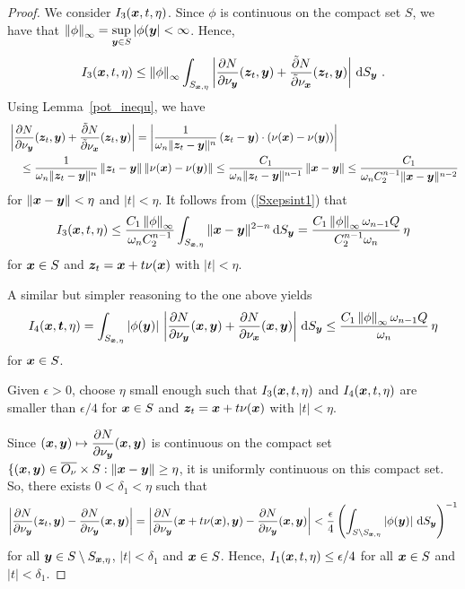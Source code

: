 \begin{proof}
 We consider $I_3({\bm{x}},t,\eta)$.
Since $\phi$ is continuous on the compact set $S$, we have that
$\displaystyle
\left\|\phi\right\|_{\infty} = \sup_{{\bm{y}}\in S}|\phi({\bm{y}}| < \infty$.
Hence,
\[
I_3({\bm{x}},t,\eta)
\leq \left\|\phi\right\|_{\infty} \int_{S_{{\bm{x}},\eta}}
\left| \frac{\partial{N}}{\partial \nu_{{\bm{y}}}}({\bm{z}}_t,{\bm{y}}) +
\frac{\tilde{\partial}{N}}{\tilde{\partial}{\nu_{{\bm{x}}}}}({\bm{z}}_t,{\bm{y}})\right| \,\mathrm{d}{S}_{{\bm{y}}} \  .
\]
Using Lemma~\ref{pot_inequ}, we have
\begin{align*}
&\left| \frac{\partial{N}}{\partial \nu_{{\bm{y}}}}({\bm{z}}_t,{\bm{y}}) +
\frac{\tilde{\partial}{N}}{\tilde{\partial}{\nu_{{\bm{x}}}}}({\bm{z}}_t,{\bm{y}})\right|
= \left| \frac{1}{\omega_n \|{\bm{z}}_t-{\bm{y}}\|^n}\,({\bm{z}}_t-{\bm{y}})\cdot
(\nu({\bm{x}}) - \nu({\bm{y}})) \right| \\
&\quad
\leq \frac{1}{\omega_n \|{\bm{z}}_t-{\bm{y}}\|^n}\,\|{\bm{z}}_t-{\bm{y}}\|\,
\|\nu({\bm{x}}) - \nu({\bm{y}})\|
\leq \frac{C_1}{\omega_n \|{\bm{z}}_t-{\bm{y}}\|^{n-1}}\,\|{\bm{x}}-{\bm{y}}\|
\leq \frac{C_1}{\omega_n C_2^{n-1}\|{\bm{x}}-{\bm{y}}\|^{n-2}}
\end{align*}
for $\|{\bm{x}} - {\bm{y}}\| < \eta$ and $|t| < \eta$.  It follows from
(\ref{Sxepsint1}) that
\[
I_3({\bm{x}},t,\eta)
\leq \frac{C_1 \left\|\phi\right\|_{\infty}}{\omega_n C_2^{n-1}}
\int_{S_{{\bm{x}},\eta}} \|{\bm{x}}-{\bm{y}}\|^{2-n} \,\mathrm{d}{S}_{{\bm{y}}}
= \frac{C_1 \left\|\phi\right\|_{\infty} \omega_{n-1} Q}{C_2^{n-1}\omega_n}
\, \eta
\]
for ${\bm{x}} \in S$ and
${\bm{z}}_t = {\bm{x}}+t\nu({\bm{x}})$ with $|t|< \eta$.

 A similar but simpler reasoning to the one above yields
\[
I_4({\bm{x}},{\bm{t}},\eta)
= \int_{S_{{\bm{x}},\eta}} \left|\phi({\bm{y}})\right|\,
\left| \frac{\partial{N}}{\partial \nu_{{\bm{y}}}}({\bm{x}},{\bm{y}}) +
\frac{\partial{N}}{\partial \nu_{{\bm{x}}}}({\bm{x}},{\bm{y}})\right| \,\mathrm{d}{S}_{{\bm{y}}}
\leq \frac{C_1 \left\|\phi\right\|_{\infty}\omega_{n-1} Q}{\omega_n}\, \eta
\]
for ${\bm{x}} \in S$.

 Given $\epsilon > 0$, choose $\eta$ small enough such that
$I_3({\bm{x}},t,\eta)$ and $I_4({\bm{x}},t,\eta)$ are smaller
than $\epsilon/4$ for ${\bm{x}} \in S$ and
${\bm{z}}_t = {\bm{x}}+t\nu({\bm{x}})$ with $|t|< \eta$.

Since $\displaystyle ({\bm{x}},{\bm{y}}) \mapsto
\frac{\partial{N}}{\partial \nu_{{\bm{y}}}}({\bm{x}},{\bm{y}})$ is
continuous on the compact set
$\{({\bm{x}},{\bm{y}}) \in \overline{O_\nu} \times S :
\|{\bm{x}} - {\bm{y}}\| \geq \eta$,
it is uniformly continuous on this compact set.  So, there exists
$0 < \delta_1 < \eta$ such that
\[
\left| \frac{\partial{N}}{\partial \nu_{{\bm{y}}}}({\bm{z}}_t,{\bm{y}}) -
\frac{\partial{N}}{\partial \nu_{{\bm{y}}}}({\bm{x}},{\bm{y}})\right|
=\left| \frac{\partial{N}}{\partial \nu_{{\bm{y}}}}({\bm{x}} + t \nu({\bm{x}}),{\bm{y}}) -
\frac{\partial{N}}{\partial \nu_{{\bm{y}}}}({\bm{x}},{\bm{y}})\right|
< \frac{\epsilon}{4} \left(
\int_{S\setminus S_{{\bm{x}},\eta}}\left|\phi({\bm{y}})\right|
\,\mathrm{d}{S}_{{\bm{y}}} \right)^{-1}
\]
for all $\displaystyle {\bm{y}} \in S \setminus S_{{\bm{x}},\eta}$,
$|t| < \delta_1$ and ${\bm{x}} \in S$.
Hence,
$\displaystyle I_1({\bm{x}},t,\eta) \leq \epsilon/4$ for all ${\bm{x}} \in S$
and $|t| < \delta_1$.


\end{proof}
